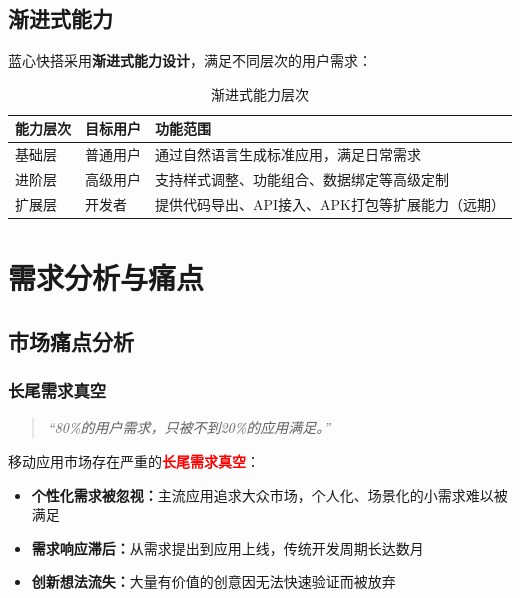 \documentclass[a4paper,12pt]{ctexart}
\newcommand{\highlight}[1]{\textcolor{vivoblue}{\textbf{#1}}}
\newcommand{\important}[1]{\textcolor{red}{\textbf{#1}}}
\begin{document}
\subsection{渐进式能力}

蓝心快搭采用\highlight{渐进式能力设计}，满足不同层次的用户需求：

\begin{table}[H]
    \centering
    \caption{渐进式能力层次}
    \begin{tabularx}{\textwidth}{|l|l|X|}
        \hline
        \textbf{能力层次} & \textbf{目标用户} & \textbf{功能范围} \\
        \hline
        基础层 & 普通用户 & 通过自然语言生成标准应用，满足日常需求 \\
        \hline
        进阶层 & 高级用户 & 支持样式调整、功能组合、数据绑定等高级定制 \\
        \hline
        扩展层 & 开发者 & 提供代码导出、API接入、APK打包等扩展能力（远期） \\
        \hline
    \end{tabularx}
\end{table}

\section{需求分析与痛点}

\subsection{市场痛点分析}

\subsubsection{长尾需求真空}

\begin{quote}
    \textit{``80\%的用户需求，只被不到20\%的应用满足。''}
\end{quote}

移动应用市场存在严重的\important{长尾需求真空}：

\begin{itemize}[leftmargin=2em]
    \item \textbf{个性化需求被忽视：}主流应用追求大众市场，个人化、场景化的小需求难以被满足
    \item \textbf{需求响应滞后：}从需求提出到应用上线，传统开发周期长达数月
    \item \textbf{创新想法流失：}大量有价值的创意因无法快速验证而被放弃
\end{itemize}
\end{document}
